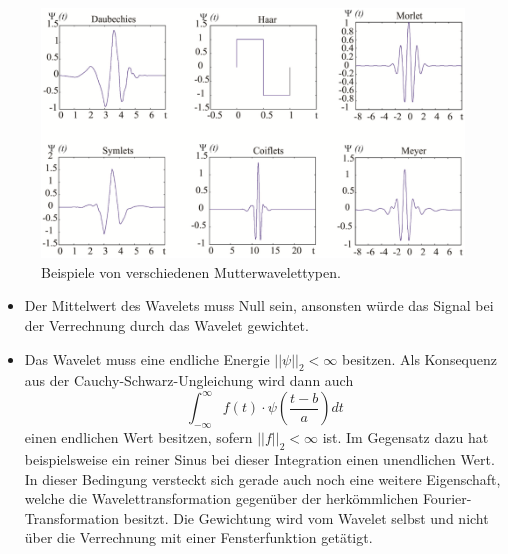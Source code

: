\begin{figure}
	\centering
	\includegraphics[width=\textwidth]{papers/wavelets/images/6-4_MutterwavletTypen.png}
	\caption{\cite{wavelets:Baleanu.2015} Beispiele von
	verschiedenen Mutterwavelettypen.}
	\label{wavelet:fig:MutterwavletTypen}
\end{figure}

\begin{itemize}
	\item Der Mittelwert des Wavelets muss Null sein, ansonsten
	würde das Signal bei der Verrechnung durch das Wavelet
	gewichtet.
	\item Das Wavelet muss eine endliche Energie $||\psi||_2<\infty$
	besitzen. Als Konsequenz aus der Cauchy-Schwarz-Ungleichung
	wird dann auch
	\begin{equation}
		\int_{-\infty}^{\infty} f(t)\cdot\psi\left(\frac{t-b}{a}\right) dt
		\label{wavelets:equation5}
	\end{equation}
	einen endlichen Wert besitzen, sofern $||f||_2<\infty$ ist.
	Im Gegensatz dazu hat beispielsweise ein reiner Sinus bei
	dieser Integration einen unendlichen Wert. In dieser Bedingung
	versteckt sich gerade auch noch eine weitere Eigenschaft,
	welche die Wavelettransformation gegenüber der herkömmlichen
	Fourier-Transformation besitzt. Die Gewichtung wird vom
	Wavelet selbst und nicht über die Verrechnung mit einer
	Fensterfunktion getätigt.
\end{itemize}







